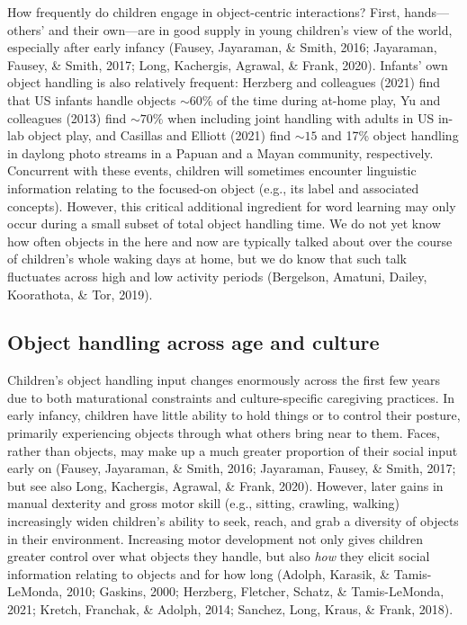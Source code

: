 \documentclass[10pt, letterpaper]{article}
\begin{document}
How frequently do children engage in object-centric interactions? First,
hands---others' and their own---are in good supply in young children's
view of the world, especially after early infancy (Fausey, Jayaraman, \&
Smith, 2016; Jayaraman, Fausey, \& Smith, 2017; Long, Kachergis,
Agrawal, \& Frank, 2020). Infants' own object handling is also
relatively frequent: Herzberg and colleagues (2021) find that US infants
handle objects \({\sim}60\%\) of the time during at-home play, Yu and
colleagues (2013) find \({\sim}70\%\) when including joint handling with
adults in US in-lab object play, and Casillas and Elliott (2021) find
\({\sim}15\) and 17\% object handling in daylong photo streams in a
Papuan and a Mayan community, respectively. Concurrent with these
events, children will sometimes encounter linguistic information
relating to the focused-on object (e.g., its label and associated
concepts). However, this critical additional ingredient for word
learning may only occur during a small subset of total object handling
time. We do not yet know how often objects in the here and now are
typically talked about over the course of children's whole waking days
at home, but we do know that such talk fluctuates across high and low
activity periods (Bergelson, Amatuni, Dailey, Koorathota, \& Tor, 2019).

\hypertarget{object-handling-across-age-and-culture}{%
\subsection{Object handling across age and
culture}\label{object-handling-across-age-and-culture}}

Children's object handling input changes enormously across the first few
years due to both maturational constraints and culture-specific
caregiving practices. In early infancy, children have little ability to
hold things or to control their posture, primarily experiencing objects
through what others bring near to them. Faces, rather than objects, may
make up a much greater proportion of their social input early on
(Fausey, Jayaraman, \& Smith, 2016; Jayaraman, Fausey, \& Smith, 2017;
but see also Long, Kachergis, Agrawal, \& Frank, 2020). However, later
gains in manual dexterity and gross motor skill (e.g., sitting,
crawling, walking) increasingly widen children's ability to seek, reach,
and grab a diversity of objects in their environment. Increasing motor
development not only gives children greater control over what objects
they handle, but also \emph{how} they elicit social information relating
to objects and for how long (Adolph, Karasik, \& Tamis-LeMonda, 2010;
Gaskins, 2000; Herzberg, Fletcher, Schatz, \& Tamis-LeMonda, 2021;
Kretch, Franchak, \& Adolph, 2014; Sanchez, Long, Kraus, \& Frank,
2018).
\end{document}
